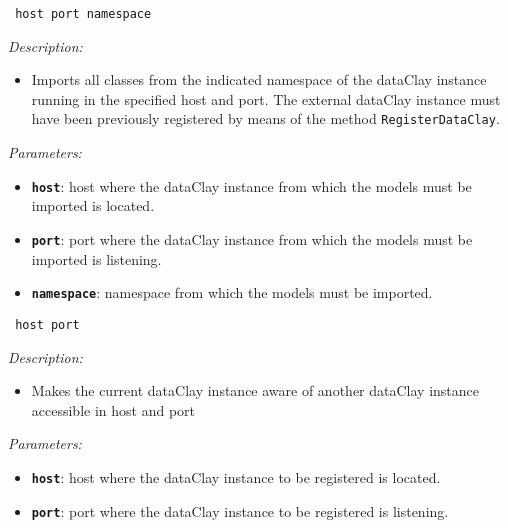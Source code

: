 \begin{dBox}
\texttt{ \newline host port namespace}
\LINE

{\it Description:}

\begin{itemize}
    \item Imports all classes from the indicated namespace of the dataClay instance running in the specified host and port. The external dataClay instance must have been previously registered by means of the method \texttt{RegisterDataClay}.
\end{itemize}

{\it Parameters:}

\begin{itemize}
    \item \texttt{\bfseries host}: host where the dataClay instance from which the models must be imported is located.
    \item \texttt{\bfseries port}: port where the dataClay instance from which the models must be imported is listening.
    \item \texttt{\bfseries namespace}: namespace from which the models must be imported.
\end{itemize}
 
\end{dBox}


\begin{dBox}
\texttt{ \newline host port}
\LINE

{\it Description:}

\begin{itemize}
    \item Makes the current dataClay instance aware of another dataClay instance accessible in host and port
\end{itemize}

{\it Parameters:}

\begin{itemize}
    \item \texttt{\bfseries host}: host where the dataClay instance to be registered is located.
    \item \texttt{\bfseries port}: port where the dataClay instance to be registered is listening.
\end{itemize}
 
\end{dBox}

